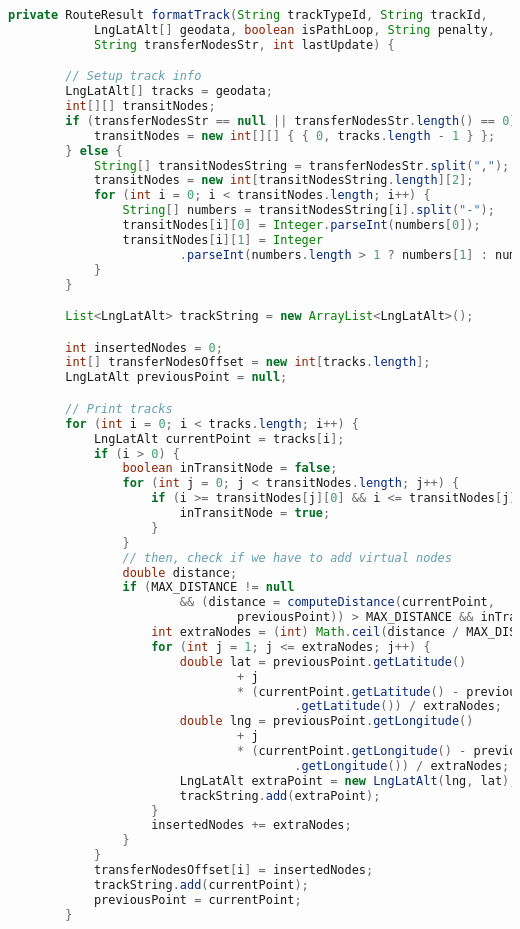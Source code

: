 \begin{lstlisting}[language=Java,basicstyle=\tiny,caption=DataPuller.java]
	private RouteResult formatTrack(String trackTypeId, String trackId,
			LngLatAlt[] geodata, boolean isPathLoop, String penalty,
			String transferNodesStr, int lastUpdate) {

		// Setup track info
		LngLatAlt[] tracks = geodata;
		int[][] transitNodes;
		if (transferNodesStr == null || transferNodesStr.length() == 0) {
			transitNodes = new int[][] { { 0, tracks.length - 1 } };
		} else {
			String[] transitNodesString = transferNodesStr.split(",");
			transitNodes = new int[transitNodesString.length][2];
			for (int i = 0; i < transitNodes.length; i++) {
				String[] numbers = transitNodesString[i].split("-");
				transitNodes[i][0] = Integer.parseInt(numbers[0]);
				transitNodes[i][1] = Integer
						.parseInt(numbers.length > 1 ? numbers[1] : numbers[0]);
			}
		}

		List<LngLatAlt> trackString = new ArrayList<LngLatAlt>();

		int insertedNodes = 0;
		int[] transferNodesOffset = new int[tracks.length];
		LngLatAlt previousPoint = null;

		// Print tracks
		for (int i = 0; i < tracks.length; i++) {
			LngLatAlt currentPoint = tracks[i];
			if (i > 0) {
				boolean inTransitNode = false;
				for (int j = 0; j < transitNodes.length; j++) {
					if (i >= transitNodes[j][0] && i <= transitNodes[j][1]) {
						inTransitNode = true;
					}
				}
				// then, check if we have to add virtual nodes
				double distance;
				if (MAX_DISTANCE != null
						&& (distance = computeDistance(currentPoint,
								previousPoint)) > MAX_DISTANCE && inTransitNode) {
					int extraNodes = (int) Math.ceil(distance / MAX_DISTANCE) - 1;
					for (int j = 1; j <= extraNodes; j++) {
						double lat = previousPoint.getLatitude()
								+ j
								* (currentPoint.getLatitude() - previousPoint
										.getLatitude()) / extraNodes;
						double lng = previousPoint.getLongitude()
								+ j
								* (currentPoint.getLongitude() - previousPoint
										.getLongitude()) / extraNodes;
						LngLatAlt extraPoint = new LngLatAlt(lng, lat);
						trackString.add(extraPoint);
					}
					insertedNodes += extraNodes;
				}
			}
			transferNodesOffset[i] = insertedNodes;
			trackString.add(currentPoint);
			previousPoint = currentPoint;
		}


\end{lstlisting}
